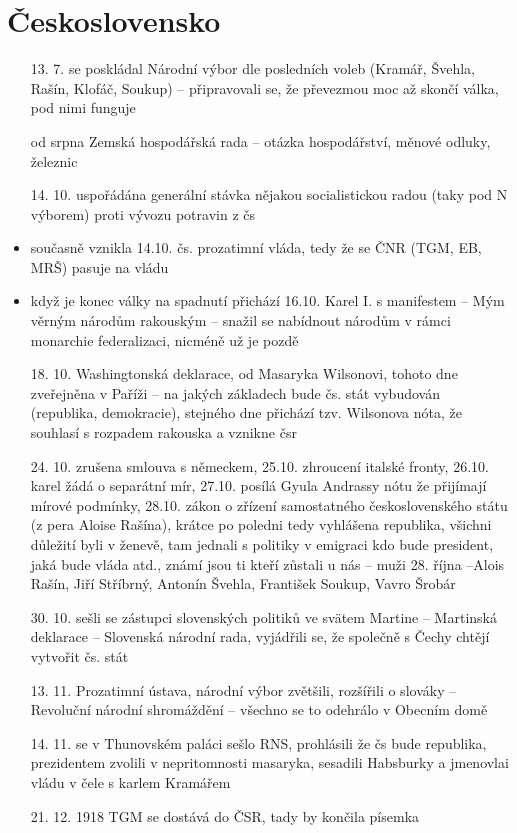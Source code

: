 \documentclass{article}
\begin{document}
\section{Československo}
\begin{itemize}
  \item[13. 7.] se poskládal Národní výbor dle posledních voleb (Kramář, Švehla, Rašín, Klofáč, Soukup) -- připravovali se, že převezmou moc až skončí válka, pod nimi funguje
  \item[od srpna] Zemská hospodářská rada -- otázka hospodářství, měnové odluky, železnic
  \item[14. 10.] uspořádána generální stávka nějakou socialistickou radou (taky pod N výborem) proti vývozu potravin z čs
  \item současně vznikla 14.10. čs. prozatimní vláda, tedy že se ČNR (TGM, EB, MRŠ) pasuje na vládu
  \item když je konec války na spadnutí přichází 16.10. Karel I. s manifestem -- Mým věrným národům rakouským -- snažil se nabídnout národům v rámci monarchie federalizaci, nicméně už je pozdě
  \item[18. 10.] Washingtonská deklarace, od Masaryka Wilsonovi, tohoto dne zveřejněna v Paříži -- na jakých základech bude čs. stát vybudován (republika, demokracie), stejného dne přichází tzv. Wilsonova nóta, že souhlasí s rozpadem rakouska a vznikne čsr
  \item[24. 10.] zrušena smlouva s německem, 25.10. zhroucení italské fronty, 26.10. karel žádá o separátní mír, 27.10. posílá Gyula Andrassy nótu že přijímají mírové podmínky, 28.10. zákon o zřízení samostatného československého státu (z pera Aloise Rašína), krátce po poledni tedy vyhlášena republika, všichni důležití byli v ženevě, tam jednali s politiky v emigraci kdo bude president, jaká bude vláda atd., známí jsou ti kteří zůstali u nás -- muži 28. října --Alois Rašín, Jiří Stříbrný, Antonín Švehla, František Soukup, Vavro Šrobár
  \item[30. 10.] sešli se zástupci slovenských politiků ve svätem Martine -- Martinská deklarace -- Slovenská národní rada, vyjádřili se, že společně s Čechy chtějí vytvořit čs. stát
  \item[13. 11.] Prozatimní ústava, národní výbor zvětšili, rozšířili o slováky -- Revoluční národní shromáždění -- všechno se to odehrálo v Obecním domě
  \item[14. 11.] se v Thunovském paláci sešlo RNS, prohlásili že čs bude republika, prezidentem zvolili v nepritomnosti masaryka, sesadili Habsburky a jmenovlai vládu v čele s karlem Kramářem
  \item[21. 12. 1918] TGM se dostává do ČSR, tady by končila písemka
\end{itemize}
\end{document}
